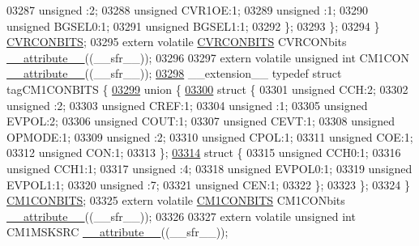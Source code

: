\begin{DoxyCode}
03287       \textcolor{keywordtype}{unsigned} :2;
03288       \textcolor{keywordtype}{unsigned} CVR1OE:1;
03289       \textcolor{keywordtype}{unsigned} :1;
03290       \textcolor{keywordtype}{unsigned} BGSEL0:1;
03291       \textcolor{keywordtype}{unsigned} BGSEL1:1;
03292     \};
03293   \};
03294 \} \hyperlink{a00008_d2/d3e/a00366}{CVRCONBITS};
03295 \textcolor{keyword}{extern} \textcolor{keyword}{volatile} \hyperlink{a00008_d2/d3e/a00366}{CVRCONBITS} CVRCONbits \hyperlink{a00009_a493c46f03454991ccc5aa7a6e1dfb2a7}{\_\_attribute\_\_}((\_\_sfr\_\_));
03296 
03297 \textcolor{keyword}{extern} \textcolor{keyword}{volatile} \textcolor{keywordtype}{unsigned} \textcolor{keywordtype}{int}  CM1CON \hyperlink{a00009_a493c46f03454991ccc5aa7a6e1dfb2a7}{\_\_attribute\_\_}((\_\_sfr\_\_));
\hypertarget{a00009_source_l03298}{}\hyperlink{a00008}{03298} \_\_extension\_\_ \textcolor{keyword}{typedef} \textcolor{keyword}{struct }tagCM1CONBITS \{
\hypertarget{a00009_source_l03299}{}\hyperlink{a00009}{03299}   \textcolor{keyword}{union }\{
\hypertarget{a00009_source_l03300}{}\hyperlink{a00009}{03300}     \textcolor{keyword}{struct }\{
03301       \textcolor{keywordtype}{unsigned} CCH:2;
03302       \textcolor{keywordtype}{unsigned} :2;
03303       \textcolor{keywordtype}{unsigned} CREF:1;
03304       \textcolor{keywordtype}{unsigned} :1;
03305       \textcolor{keywordtype}{unsigned} EVPOL:2;
03306       \textcolor{keywordtype}{unsigned} COUT:1;
03307       \textcolor{keywordtype}{unsigned} CEVT:1;
03308       \textcolor{keywordtype}{unsigned} OPMODE:1;
03309       \textcolor{keywordtype}{unsigned} :2;
03310       \textcolor{keywordtype}{unsigned} CPOL:1;
03311       \textcolor{keywordtype}{unsigned} COE:1;
03312       \textcolor{keywordtype}{unsigned} CON:1;
03313     \};
\hypertarget{a00009_source_l03314}{}\hyperlink{a00009}{03314}     \textcolor{keyword}{struct }\{
03315       \textcolor{keywordtype}{unsigned} CCH0:1;
03316       \textcolor{keywordtype}{unsigned} CCH1:1;
03317       \textcolor{keywordtype}{unsigned} :4;
03318       \textcolor{keywordtype}{unsigned} EVPOL0:1;
03319       \textcolor{keywordtype}{unsigned} EVPOL1:1;
03320       \textcolor{keywordtype}{unsigned} :7;
03321       \textcolor{keywordtype}{unsigned} CEN:1;
03322     \};
03323   \};
03324 \} \hyperlink{a00008_df/d95/a00299}{CM1CONBITS};
03325 \textcolor{keyword}{extern} \textcolor{keyword}{volatile} \hyperlink{a00008_df/d95/a00299}{CM1CONBITS} CM1CONbits \hyperlink{a00009_a493c46f03454991ccc5aa7a6e1dfb2a7}{\_\_attribute\_\_}((\_\_sfr\_\_));
03326 
03327 \textcolor{keyword}{extern} \textcolor{keyword}{volatile} \textcolor{keywordtype}{unsigned} \textcolor{keywordtype}{int}  CM1MSKSRC \hyperlink{a00009_a493c46f03454991ccc5aa7a6e1dfb2a7}{\_\_attribute\_\_}((\_\_sfr\_\_));

\end{DoxyCode}
